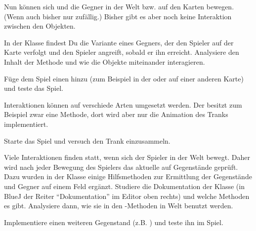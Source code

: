 \documentclass[11pt, a4paper]{arbeitsblatt}
\begin{document}
\begin{aufgabe}[subtitle=Interaktionen 1]
	\label{aufg:interaktionen-1}
	Nun können sich  und die Gegner in der Welt bzw. auf den
	Karten bewegen. (Wenn auch bisher nur zufällig.) Bisher gibt es aber noch keine
	Interaktion zwischen den Objekten.

	\begin{enuma}
		\item In der Klasse  findest Du die Variante eines Gegners, der
		      den Spieler auf der Karte verfolgt und den Spieler angreift, sobald er ihn
		      erreicht. Analysiere den Inhalt der  Methode und wie die
		      Objekte miteinander interagieren.
		\item Füge dem Spiel einen  hinzu (zum Beispiel in der
		       oder auf einer anderen Karte) und teste das Spiel.
	\end{enuma}
\end{aufgabe}

\begin{aufgabe}[subtitle=Interaktionen 2]
	\label{aufg:interaktionen-2}
	Interaktionen können auf verschiede Arten umgesetzt werden. Der
	 besitzt zum Beispiel zwar eine \code{tick()}
	Methode, dort wird aber nur die Animation des Tranks implementiert.

	\begin{enuma}
		\item Starte das Spiel und versuch den Trank einzusammeln.
		\item Viele Interaktionen finden statt, wenn sich der Spieler in der Welt bewegt.
		      Daher wird nach jeder Bewegung des Spielers das aktuelle \code{Feld}
		      auf Gegenstände geprüft. Dazu wurden in der Klasse \code{Karte}
		      einige Hilfsmethoden zur Ermittlung der Gegenstände und Gegner auf einem Feld
		      ergänzt. Studiere die Dokumentation der Klasse (in BlueJ der Reiter
		      \enquote{Dokumentation} im Editor oben rechts) und welche Methoden es gibt.
		      Analysiere dann, wie sie in den -Methoden in Welt benutzt
		      werden.
		\item Implementiere einen weiteren Gegenstand (z.B. ) und teste
		      ihn im Spiel.
	\end{enuma}
\end{aufgabe}
\end{document}
